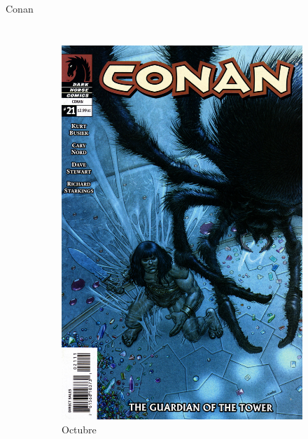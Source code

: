 \begin{frame}{Conan}
\begin{columns}
\begin{figure}[htp]
\begin{subfigure}[b]{0.3\textwidth}
				\includegraphics[width=\textwidth]{img/DarkHorse21Portada}
				\caption{Octubre}
			\end{subfigure}
			~
			\begin{subfigure}[b]{0.3\textwidth}

\end{subfigure}
\end{figure}
\end{columns}
\end{frame}
